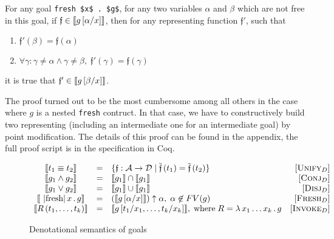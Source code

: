 \begin{lemma}
\label{lem:den_sem_change_var}
For any goal \lstinline|fresh $x$ . $g$|, for any two variables $\alpha$ and $\beta$ which are not free in this goal,
if $\mathfrak{f} \in \llbracket{g\,[\alpha/x]}\rrbracket$, then for any representing function $\mathfrak{f}'$, such that

\begin{enumerate}
\item $\mathfrak{f}'(\beta) = \mathfrak{f}(\alpha)$
\item $\forall \gamma: \gamma \neq \alpha \land \gamma \neq \beta,\; \mathfrak{f}'(\gamma) = \mathfrak{f}(\gamma)$
\end{enumerate}

\noindent it is true that $\mathfrak{f}' \in \llbracket{g\,[\beta/x]}\rrbracket$.
\end{lemma}
  The proof turned out to be the most cumbersome among all others in the case where $g$ is a nested \lstinline|fresh| contruct. In that case, we have to constructively build two representing (including an intermediate one for an intermediate goal) by point modification. The details of this proof can be found in the appendix, the full proof script is in the specification in Coq.

\begin{figure}[t]
  \[
  \begin{array}{cclr}
    \sembr{t_1\equiv t_2}&=&\{\mathfrak f : \mathcal{A}\to\mathcal{D}\mid \overline{\mathfrak{f}}\,(t_1)=\overline{\mathfrak{f}}\,(t_2)\}& \ruleno{Unify$_D$}\\
    \sembr{g_1\wedge g_2}&=&\sembr{g_1}\cap\sembr{g_1}&\ruleno{Conj$_D$}\\
    \sembr{g_1\vee g_2}&=&\sembr{g_1}\cup\sembr{g_1}&\ruleno{Disj$_D$}\\
    \sembr{\mbox{\lstinline|fresh|}\,x\,.\,g}&=&(\sembr{g\,[\alpha/x]})\uparrow\alpha,\;\alpha\not\in FV(g)& \ruleno{Fresh$_D$}\\
    \sembr{R\,(t_1,\dots,t_k)}&=&\sembr{g\,[t_1/x_1,\dots,t_k/x_k]},\;\mbox{where}\;R=\lambda\,x_1\dots x_k\,.\,g & \ruleno{Invoke$_D$}
  \end{array}
  \]
  \caption{Denotational semantics of goals}
  \label{denotational_semantics_of_goals}
\end{figure}

